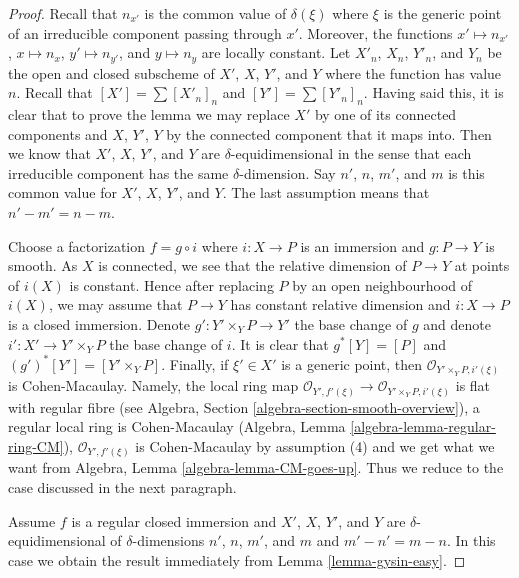 \begin{proof}
Recall that $n_{x'}$ is the common value of $\delta(\xi)$
where $\xi$ is the generic point of an irreducible component
passing through $x'$. Moreover, the functions
$x' \mapsto n_{x'}$, $x \mapsto n_x$, $y' \mapsto n_{y'}$, and
$y \mapsto n_y$ are locally constant. Let $X'_n$, $X_n$, $Y'_n$,
and $Y_n$ be the open and closed subscheme of $X'$, $X$, $Y'$, and
$Y$ where the function has value $n$. Recall that
$[X'] = \sum [X'_n]_n$ and $[Y'] = \sum [Y'_n]_n$.
Having said this, it is clear that to prove the lemma we
may replace $X'$ by one of its connected components
and $X$, $Y'$, $Y$ by the connected component that
it maps into. Then we know that $X'$, $X$, $Y'$, and
$Y$ are $\delta$-equidimensional in the sense that
each irreducible component has the same $\delta$-dimension.
Say $n'$, $n$, $m'$, and $m$ is this common value
for $X'$, $X$, $Y'$, and $Y$. The last assumption
means that $n' - m' = n - m$.

\medskip\noindent
Choose a factorization $f = g \circ i$ where $i : X \to P$
is an immersion and $g : P \to Y$ is smooth. As $X$ is connected,
we see that the relative dimension of $P \to Y$ at points of $i(X)$
is constant. Hence after replacing $P$ by an open neighbourhood
of $i(X)$, we may assume that $P \to Y$ has constant relative dimension
and $i : X \to P$ is a closed immersion.
Denote $g' : Y' \times_Y P \to Y'$ the base change of $g$ and denote
$i' : X' \to Y' \times_Y P$ the base change of $i$.
It is clear that $g^*[Y] = [P]$ and $(g')^*[Y'] = [Y' \times_Y P]$.
Finally, if $\xi' \in X'$ is a generic point, then
$\mathcal{O}_{Y' \times_Y P, i'(\xi)}$ is Cohen-Macaulay.
Namely, the local ring map
$\mathcal{O}_{Y', f'(\xi)} \to \mathcal{O}_{Y' \times_Y P, i'(\xi)}$
is flat with regular fibre
(see Algebra, Section \ref{algebra-section-smooth-overview}),
a regular local ring is Cohen-Macaulay
(Algebra, Lemma \ref{algebra-lemma-regular-ring-CM}),
$\mathcal{O}_{Y', f'(\xi)}$ is Cohen-Macaulay by assumption
(4) and we get what we want from
Algebra, Lemma \ref{algebra-lemma-CM-goes-up}.
Thus we reduce to the case discussed in the next paragraph.

\medskip\noindent
Assume $f$ is a regular closed immersion and $X'$, $X$, $Y'$, and
$Y$ are $\delta$-equidimensional of $\delta$-dimensions
$n'$, $n$, $m'$, and $m$ and $m' - n' = m - n$.
In this case we obtain the result immediately from
Lemma \ref{lemma-gysin-easy}.
\end{proof}

